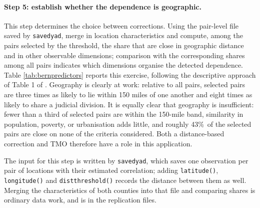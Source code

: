 \documentclass[varwidth,bib]{statapress}
\begin{document}
\paragraph{Step 5: establish whether the dependence is geographic.}
This step determines the choice between corrections.  Using the pair-level file saved by {\tt savedyad}, merge in location characteristics and compute, among the pairs selected by the threshold, the share that are close in geographic distance and in other observable dimensions; comparison with the corresponding shares among all pairs indicates which dimensions organise the detected dependence.  Table \ref{tab:bernpredictors} reports this exercise, following the descriptive approach of Table 1 of \citet{Dellavignaetal2025}.  Geography is clearly at work: relative to all pairs, selected pairs are three times as likely to lie within 150 miles of one another and eight times as likely to share a judicial division.  It is equally clear that geography is insufficient: fewer than a third of selected pairs are within the 150-mile band, similarity in population, poverty, or urbanisation adds little, and roughly 43\%\ of the selected pairs are close on none of the criteria considered.  Both a distance-based correction and TMO therefore have a role in this application.

The input for this step is written by {\tt savedyad}, which saves one observation per pair of locations with their estimated correlation; adding {\tt latitude()}, {\tt longitude()} and {\tt distthreshold()} records the distance between them as well.  Merging the characteristics of both counties into that file and comparing shares is ordinary data work, and is in the replication files.

\begin{stlog}

\end{stlog}
\end{document}
